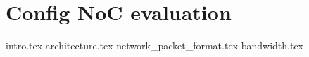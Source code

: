 \chapter{Config NoC evaluation}
{intro.tex}
{architecture.tex}
{network_packet_format.tex}
{bandwidth.tex}